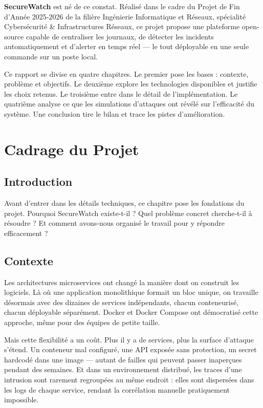 \documentclass[12pt, a4paper]{report}
\begin{document}
\textbf{SecureWatch} est né de ce constat. Réalisé dans le cadre du Projet de Fin d'Année 2025-2026 de la filière Ingénierie Informatique et Réseaux, spécialité Cybersécurité \& Infrastructures Réseaux, ce projet propose une plateforme open-source capable de centraliser les journaux, de détecter les incidents automatiquement et d'alerter en temps réel — le tout déployable en une seule commande sur un poste local.

Ce rapport se divise en quatre chapitres. Le premier pose les bases : contexte, problème et objectifs. Le deuxième explore les technologies disponibles et justifie les choix retenus. Le troisième entre dans le détail de l'implémentation. Le quatrième analyse ce que les simulations d'attaques ont révélé sur l'efficacité du système. Une conclusion tire le bilan et trace les pistes d'amélioration.

\chapter{Cadrage du Projet}

\section{Introduction}

Avant d'entrer dans les détails techniques, ce chapitre pose les fondations du projet. Pourquoi SecureWatch existe-t-il ? Quel problème concret cherche-t-il à résoudre ? Et comment avons-nous organisé le travail pour y répondre efficacement ?

\section{Contexte}

Les architectures microservices ont changé la manière dont on construit les logiciels. Là où une application monolithique formait un bloc unique, on travaille désormais avec des dizaines de services indépendants, chacun conteneurisé, chacun déployable séparément. Docker et Docker Compose ont démocratisé cette approche, même pour des équipes de petite taille.

Mais cette flexibilité a un coût. Plus il y a de services, plus la surface d'attaque s'étend. Un conteneur mal configuré, une API exposée sans protection, un secret hardcodé dans une image — autant de failles qui peuvent passer inaperçues pendant des semaines. Et dans un environnement distribué, les traces d'une intrusion sont rarement regroupées au même endroit : elles sont dispersées dans les logs de chaque service, rendant la corrélation manuelle pratiquement impossible.
\end{document}
